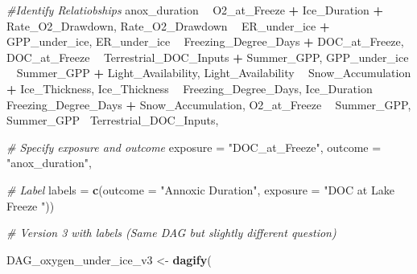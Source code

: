 \documentclass[]{article}
\newenvironment{Shaded}{\begin{snugshade}}{\end{snugshade}}
\newcommand{\CommentTok}[1]{\textcolor[rgb]{0.56,0.35,0.01}{\textit{#1}}}
\newcommand{\DataTypeTok}[1]{\textcolor[rgb]{0.13,0.29,0.53}{#1}}
\newcommand{\KeywordTok}[1]{\textcolor[rgb]{0.13,0.29,0.53}{\textbf{#1}}}
\newcommand{\NormalTok}[1]{#1}
\newcommand{\OperatorTok}[1]{\textcolor[rgb]{0.81,0.36,0.00}{\textbf{#1}}}
\newcommand{\StringTok}[1]{\textcolor[rgb]{0.31,0.60,0.02}{#1}}
\begin{document}
\begin{Shaded}
\begin{Highlighting}[]
      \CommentTok{#Identify Relatiobships }
\NormalTok{      anox_duration }\OperatorTok{~}\StringTok{ }\NormalTok{O2_at_Freeze }\OperatorTok{+}\StringTok{ }\NormalTok{Ice_Duration }\OperatorTok{+}\StringTok{ }\NormalTok{Rate_O2_Drawdown,}
\NormalTok{      Rate_O2_Drawdown }\OperatorTok{~}\StringTok{ }\NormalTok{ER_under_ice }\OperatorTok{+}\StringTok{ }\NormalTok{GPP_under_ice, }
\NormalTok{      ER_under_ice }\OperatorTok{~}\StringTok{ }\NormalTok{Freezing_Degree_Days }\OperatorTok{+}\StringTok{ }\NormalTok{DOC_at_Freeze,}
\NormalTok{      DOC_at_Freeze }\OperatorTok{~}\StringTok{ }\NormalTok{Terrestrial_DOC_Inputs }\OperatorTok{+}\StringTok{ }\NormalTok{Summer_GPP, }
\NormalTok{      GPP_under_ice }\OperatorTok{~}\StringTok{ }\NormalTok{Summer_GPP }\OperatorTok{+}\StringTok{ }\NormalTok{Light_Availability,}
\NormalTok{      Light_Availability }\OperatorTok{~}\StringTok{ }\NormalTok{Snow_Accumulation }\OperatorTok{+}\StringTok{ }\NormalTok{Ice_Thickness,}
\NormalTok{      Ice_Thickness }\OperatorTok{~}\StringTok{ }\NormalTok{Freezing_Degree_Days,}
\NormalTok{      Ice_Duration }\OperatorTok{~}\StringTok{ }\NormalTok{Freezing_Degree_Days }\OperatorTok{+}\StringTok{ }\NormalTok{Snow_Accumulation, }
\NormalTok{      O2_at_Freeze }\OperatorTok{~}\StringTok{ }\NormalTok{Summer_GPP,}
\NormalTok{      Summer_GPP}\OperatorTok{~}\StringTok{ }\NormalTok{Terrestrial_DOC_Inputs,}
    
      \CommentTok{# Specify exposure and outcome }
      \DataTypeTok{exposure =} \StringTok{"DOC_at_Freeze"}\NormalTok{, }
      \DataTypeTok{outcome =} \StringTok{"anox_duration"}\NormalTok{,}
      
      \CommentTok{# Label }
      \DataTypeTok{labels =} \KeywordTok{c}\NormalTok{(}\DataTypeTok{outcome =} \StringTok{"Annoxic Duration"}\NormalTok{,}
                 \DataTypeTok{exposure =} \StringTok{"DOC at Lake Freeze "}\NormalTok{))}
    
\CommentTok{# Version 3 with labels (Same DAG but slightly different question)}

\NormalTok{    DAG_oxygen_under_ice_v3 <-}\StringTok{ }\KeywordTok{dagify}\NormalTok{(}
      

\end{Highlighting}
\end{Shaded}
\end{document}
